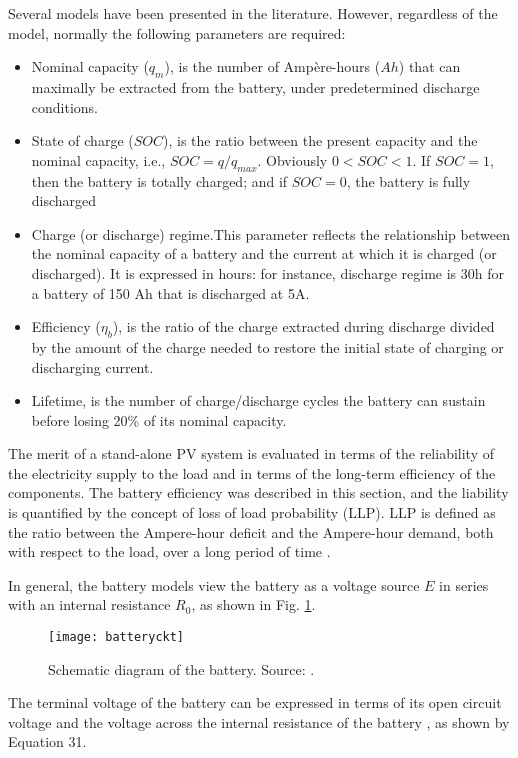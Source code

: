 Several models have been presented in the literature. However, regardless of the model, normally the following parameters are required: 

\begin{itemize}
\item Nominal capacity ($ q_{m} $), is the number of Ampère-hours ($ Ah $) that can maximally be extracted from the battery, under predetermined discharge conditions.
\item State of charge ($ SOC $), is the ratio between the present capacity and the nominal capacity, i.e., $ SOC = q/q_{max} $. Obviously $ 0<SOC<1 $. If $ SOC=1 $, then the battery is totally charged; and if $ SOC=0 $, the battery is fully discharged
\item Charge (or discharge) regime.This parameter reflects the relationship between the nominal capacity of a battery and the current at which it is charged (or discharged). It is expressed in hours: for instance, discharge regime is 30h for a battery of 150 Ah that is discharged at 5A.
\item Efficiency ($\eta_{b}$), is the ratio of the charge extracted during discharge divided by the amount of the charge needed to restore the initial state of charging or discharging current. 
\item Lifetime, is the number of charge/discharge cycles the battery can sustain before losing 20\% of its nominal capacity.
\end{itemize}

The merit of a stand-alone PV system is evaluated in terms of the reliability of the electricity supply to the load and in terms of the long-term efficiency of the components. The battery efficiency was described in this section, and the liability is quantified by the concept of loss of load probability (LLP). LLP is defined as the ratio between the Ampere-hour deficit and the Ampere-hour demand, both with respect to the load, over a long period of time \cite{Copetti}. 

In general, the battery models view the battery as a voltage source $ E $ in series with an internal resistance $ R_{0} $, as shown in Fig. \ref{fig:batteryckt}. 

\begin{figure}[h]
\texttt{[image: batteryckt]}
\centering
\caption{Schematic diagram of the battery. Source: \cite{Hansen}.}
\label{fig:batteryckt}
\end{figure}


The terminal voltage of the battery can be expressed in terms of its open circuit voltage and the voltage across the internal resistance of the battery \cite{Sukamongkol}, as shown by Equation 31.  

